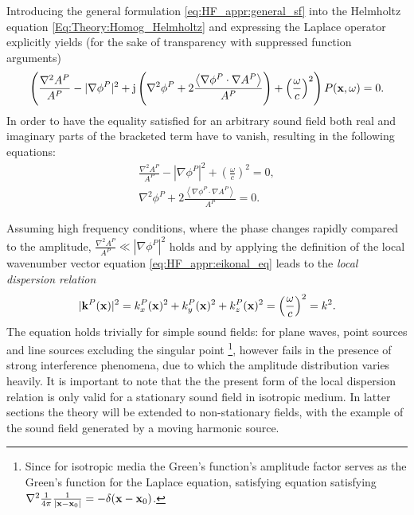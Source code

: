 Introducing the general formulation \eqref{eq:HF_appr:general_sf} into the Helmholtz equation \eqref{Eq:Theory:Homog_Helmholtz} and expressing the Laplace operator explicitly yields (for the sake of transparency with suppressed function arguments)
\begin{equation}
\left( 
\frac{\nabla^2 A^P}{A^P} 
- 
| \nabla \phi^P |^2
+ 
\mathrm{j} \left(  
\nabla^2 \phi^P
+ 2\frac{ \left< \nabla \phi^P \cdot \nabla A^P \right> }{A^P} 
\right)
+ \left(\frac{\omega}{c}\right)^2 
\right) 
P(\mathbf{x},\omega) = 0.
\label{eq:HF_appr:ray_tracing_helmholtz}
\end{equation}
In order to have the equality satisfied for an arbitrary sound field both real and imaginary parts of the bracketed term have to vanish, resulting in the following equations:
\begin{eqnarray} \label{eq:HF_appr:eikonal_eq}
\frac{\nabla^2 A^P}{A^P}  - | \nabla \phi^P |^2 + \left(\frac{\omega}{c}\right)^2 = 0, \\ 
\label{eq:HF_appr:transport_eq}
\nabla^2 \phi^P + 2\frac{ \left< \nabla \phi^P \cdot \nabla A^P \right> }{A^P} = 0.
\end{eqnarray}

Assuming high frequency conditions, where the phase changes rapidly compared to the amplitude, $\frac{\nabla^2 A^P}{A^P} \ll | \nabla \phi^P |^2$ holds
and by applying the definition of the local wavenumber vector equation \eqref{eq:HF_appr:eikonal_eq} leads to the \emph{local dispersion relation}
\begin{equation}
|\mathbf{k}^P(\mathbf{x})|^2 = k^P_x(\mathbf{x})^2 + k^P_y(\mathbf{x})^2 + k^P_z(\mathbf{x})^2 = \left( \frac{\omega}{c} \right)^2 = k^2.
\label{eq:HF_appr:local_dispersion}
\end{equation}
%
The equation holds trivially for simple sound fields: for plane waves, point sources and line sources excluding the singular point \footnote{Since for isotropic media the Green's function's amplitude factor serves as the Green's function for the Laplace equation, satisfying equation satisfying $\nabla^2 \frac{1}{4\pi} \frac{1}{|\mathbf{x}-\mathbf{x}_0|} = -\delta(\mathbf{x}-\mathbf{x}_0)$.}, however fails in the presence of strong interference phenomena, due to which the amplitude distribution varies heavily.
It is important to note that the the present form of the local dispersion relation is only valid for a stationary sound field in isotropic medium.
In latter sections the theory will be extended to non-stationary fields, with the example of the sound field generated by a moving harmonic source.

